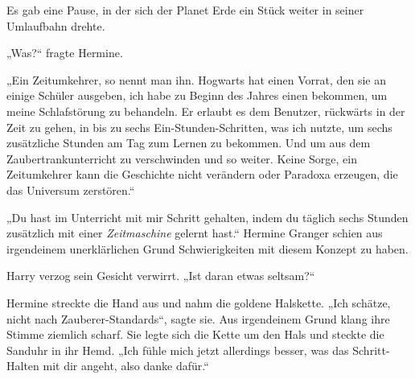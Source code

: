 Es gab eine Pause, in der sich der Planet Erde ein Stück weiter in seiner Umlaufbahn drehte.

„Was?“ fragte Hermine.

„Ein Zeitumkehrer, so nennt man ihn. Hogwarts hat einen Vorrat, den sie an einige Schüler ausgeben, ich habe zu Beginn des Jahres einen bekommen, um meine Schlafstörung zu behandeln. Er erlaubt es dem Benutzer, rückwärts in der Zeit zu gehen, in bis zu sechs Ein-Stunden-Schritten, was ich nutzte, um sechs zusätzliche Stunden am Tag zum Lernen zu bekommen. Und um aus dem Zaubertrankunterricht zu verschwinden und so weiter. Keine Sorge, ein Zeitumkehrer kann die Geschichte nicht verändern oder Paradoxa erzeugen, die das Universum zerstören.“

„Du hast im Unterricht mit mir Schritt gehalten, indem du täglich sechs Stunden zusätzlich mit einer \emph{Zeitmaschine} gelernt hast.“
Hermine Granger schien aus irgendeinem unerklärlichen Grund Schwierigkeiten mit diesem Konzept zu haben.

Harry verzog sein Gesicht verwirrt.
„Ist daran etwas seltsam?“

Hermine streckte die Hand aus und nahm die goldene Halskette.
„Ich schätze, nicht nach Zauberer-Standards“, sagte sie.
Aus irgendeinem Grund klang ihre Stimme ziemlich scharf.
Sie legte sich die Kette um den Hals und steckte die Sanduhr in ihr Hemd.
„Ich fühle mich jetzt allerdings besser, was das Schritt-Halten mit dir angeht, also danke dafür.“

